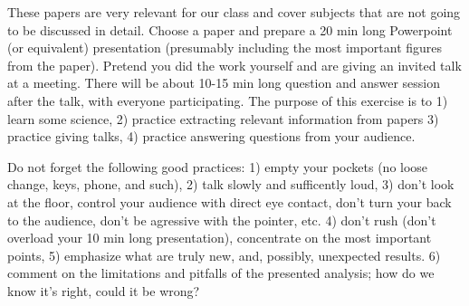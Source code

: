 \documentclass[10pt]{article}
\begin{document}
These papers are very relevant for our class and cover subjects that are
not going to be discussed in detail. Choose a paper and prepare a 20 min long 
Powerpoint (or equivalent) presentation
(presumably including the most important figures from the paper). Pretend 
you did the work yourself and are giving an invited talk at a meeting. 
There will be about 10-15 min long question and answer session after the talk,
with everyone participating. 
The purpose of this exercise is to 1) learn some science, 2) practice 
extracting relevant information from papers 3) practice giving talks,
4) practice answering questions from your audience.

Do not forget the following good practices: 
1) empty your pockets (no loose change, keys, phone, and such),
2) talk slowly and sufficently loud, 3) don't look at the floor, control
your audience with direct eye contact, don't turn your back to the audience, 
don't be agressive with the pointer, etc. 4) don't rush (don't overload 
your 10 min long presentation), concentrate on the most important points,
5) emphasize what are truly new, and, possibly, unexpected results.
6) comment on the limitations and pitfalls of the presented analysis;
how do we know it's right, could it be wrong?
\end{document}
